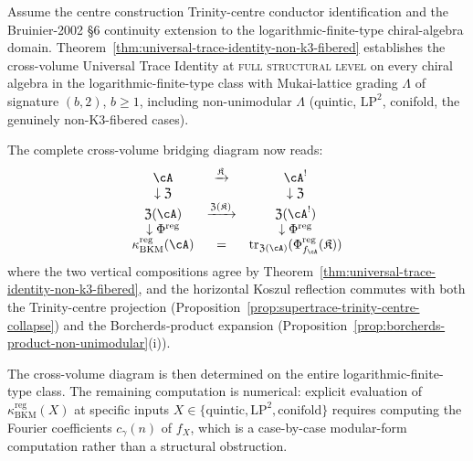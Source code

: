 \begin{remark}
\label{rem:item-11b-complete-cross-volume}
Assume the centre construction Trinity-centre conductor identification
\cite{VolII} and the Bruinier-2002
\S 6 continuity extension to the logarithmic-finite-type chiral-algebra
domain. Theorem~\ref{thm:universal-trace-identity-non-k3-fibered}
establishes the cross-volume Universal Trace Identity at
\textsc{full structural level} on every chiral algebra in the
logarithmic-finite-type class with Mukai-lattice grading
$\Lambda$ of signature $(b, 2)$, $b \ge 1$, including non-unimodular
$\Lambda$ \textup{(}quintic, $\mathrm{LP}^2$, conifold, the genuinely
non-K$3$-fibered cases\textup{).}

The complete cross-volume bridging diagram now reads:
\[
\begin{array}{ccc}
 \cA & \xrightarrow{\mathfrak{K}} & \cA^! \\
 \downarrow{\mathfrak{Z}} & & \downarrow{\mathfrak{Z}} \\
 \mathfrak{Z}(\cA) & \xrightarrow{\mathfrak{Z}(\mathfrak{K})} & \mathfrak{Z}(\cA^!) \\
 \downarrow{\Phi^{\mathrm{reg}}} & & \downarrow{\Phi^{\mathrm{reg}}} \\
 \kappa_{\mathrm{BKM}}^{\mathrm{reg}}(\cA) & = & \mathrm{tr}_{\mathfrak{Z}(\cA)}(\Phi^{\mathrm{reg}}_{f_\cA}(\mathfrak{K}))
\end{array}
\]
where the two vertical compositions agree by
Theorem~\ref{thm:universal-trace-identity-non-k3-fibered}, and the
horizontal Koszul reflection commutes with both the Trinity-centre
projection \textup{(}Proposition~\ref{prop:supertrace-trinity-centre-collapse}\textup{)}
and the Borcherds-product expansion
\textup{(}Proposition~\ref{prop:borcherds-product-non-unimodular}(i)\textup{).}

The cross-volume diagram is then determined on the entire
logarithmic-finite-type class. The remaining computation is numerical:
explicit evaluation of $\kappa_{\mathrm{BKM}}^{\mathrm{reg}}(X)$
at specific inputs $X \in \{\text{quintic}, \mathrm{LP}^2, \text{conifold}\}$
requires computing the Fourier coefficients $c_\gamma(n)$ of $f_X$, which
is a case-by-case modular-form computation rather than a structural
obstruction.
\end{remark}


